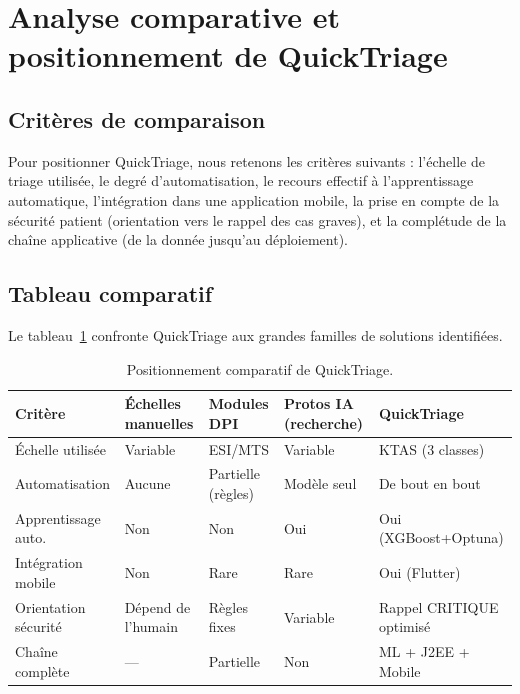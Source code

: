 \section{Analyse comparative et positionnement de QuickTriage}

\subsection{Critères de comparaison}
Pour positionner QuickTriage, nous retenons les critères suivants : l'échelle de triage
utilisée, le degré d'automatisation, le recours effectif à l'apprentissage automatique,
l'intégration dans une application mobile, la prise en compte de la sécurité patient
(orientation vers le rappel des cas graves), et la complétude de la chaîne applicative
(de la donnée jusqu'au déploiement).

\subsection{Tableau comparatif}
Le tableau~\ref{tab:positionnement} confronte QuickTriage aux grandes familles de solutions
identifiées.

\begin{table}[h]
\centering
\renewcommand{\arraystretch}{1.4}
\small
\begin{tabular}{p{3.2cm} p{2.3cm} p{2.3cm} p{2.3cm} p{3.2cm}}
\toprule
\textbf{Critère} & \textbf{Échelles manuelles} & \textbf{Modules DPI} & \textbf{Protos IA (recherche)} & \textbf{QuickTriage} \\
\midrule
Échelle utilisée        & Variable & ESI/MTS & Variable & KTAS (3 classes) \\
Automatisation          & Aucune & Partielle (règles) & Modèle seul & De bout en bout \\
Apprentissage auto.     & Non & Non & Oui & Oui (XGBoost+Optuna) \\
Intégration mobile      & Non & Rare & Rare & Oui (Flutter) \\
Orientation sécurité    & Dépend de l'humain & Règles fixes & Variable & Rappel CRITIQUE optimisé \\
Chaîne complète         & --- & Partielle & Non & ML + J2EE + Mobile \\
\bottomrule
\end{tabular}
\caption{Positionnement comparatif de QuickTriage.}
\label{tab:positionnement}
\end{table}

